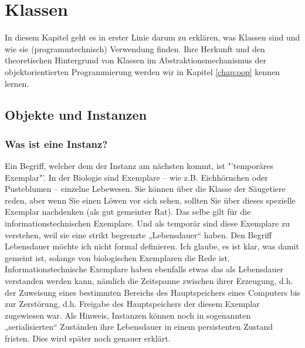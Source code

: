 \chapter{Klassen}

In diesem Kapitel geht es in erster Linie darum zu erklären, was Klassen sind und wie sie (programmtechnisch) Verwendung finden. Ihre Herkunft und den theoretischen Hintergrund von Klassen im Abstraktionsmechanismus der objektorientierten Programmierung werden wir in Kapitel \ref{chap:oop} kennen lernen.

\section{Objekte und Instanzen}

\subsection{Was ist eine Instanz?}\label{ref:instance}

Ein Begriff, welcher dem der Instanz am nächsten kommt, ist "'temporäres Exemplar"'. In der Biologie sind Exemplare – wie z.B. Eichhörnchen oder Pusteblumen – einzelne Lebewesen. Sie können über die Klasse der Säugetiere reden, aber wenn Sie einen Löwen vor sich sehen, sollten Sie über dieses spezielle Exemplar nachdenken (als gut gemeinter Rat). Das selbe gilt für die informationstechnischen Exemplare. Und als temporär sind diese Exemplare zu verstehen, weil sie eine strikt begrenzte „Lebensdauer“ haben. Den Begriff Lebensdauer möchte ich nicht formal definieren. Ich glaube, es ist klar, was damit gemeint ist, solange von biologischen Exemplaren die Rede ist. Informationstechnische Exemplare haben ebenfalls etwas das als Lebensdauer verstanden werden kann, nämlich die Zeitspanne zwischen ihrer Erzeugung, d.h. der Zuweisung eines bestimmten Bereichs des Hauptspeichers eines Computers bis zur Zerstörung, d.h. Freigabe des Hauptspeichers der diesem Exemplar zugewiesen war. Als Hinweis, Instanzen können noch in sogenannten „serialisierten“ Zuständen ihre Lebensdauer in einem persistenten Zustand fristen. Dies wird später noch genauer erklärt. 


